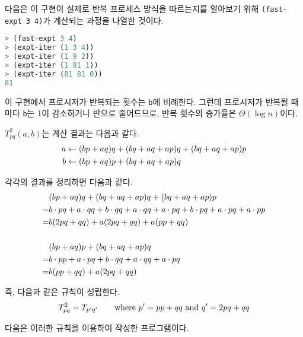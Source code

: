 다음은 이 구현이 실제로 반복 프로세스 방식을 따르는지를 알아보기 위해
\texttt{(fast-expt~3~4)}가 계산되는 과정을 나열한 것이다.

\begin{lstlisting}[language=Scheme]
> (fast-expt 3 4)
> (expt-iter (1 3 4))
> (expt-iter (1 9 2))
> (expt-iter (1 81 1))
> (expt-iter (81 81 0))
81
\end{lstlisting}



이 구현에서 프로시저가 반복되는 횟수는 \texttt{b}에 비례한다. 그런데
프로시저가 반복될 때마다 \texttt{b}는 1이 감소하거나 반으로 줄어드므로, 반복
횟수의 증가율은 $\Theta(\log n)$이다.




 
$T_{pq}^2(a,b)$는 계산 결과는 다음과 같다.
\begin{align}
  a &\leftarrow (bp+aq)q + (bq+aq+ap)q + (bq+aq+ap)p \notag\\
  b &\leftarrow (bp+aq)p + (bq+aq+ap)q \notag
\end{align}

각각의 결과를 정리하면 다음과 같다.
\begin{align}
    & (bp+aq)q + (bq+aq+ap)q + (bq+aq+ap)p \notag\\
   =& b\cdot pq + a\cdot qq + b\cdot qq + a\cdot qq + a\cdot pq
      + b\cdot pq + a\cdot pq + a\cdot pp \notag\\
   =& b(2pq + qq) + a(2pq + qq) + a(pp+qq) \notag\\
   \notag\\
    & (bp+aq)p + (bq+aq+ap)q \notag\\
   =& b\cdot pp + a\cdot pq + b\cdot qq + a\cdot qq + a\cdot pq \notag\\
   =& b(pp+qq) + a(2pq+qq) \notag
\end{align}

즉, 다음과 같은 규칙이 성립한다.
\begin{equation}\notag
  T_{pq}^2 = T_{p'q'} \qquad \text{where } p'=pp+qq \text{~and~} q'=2pq+qq
\end{equation}

다음은 이러한 규칙을 이용하여 작성한 프로그램이다.

